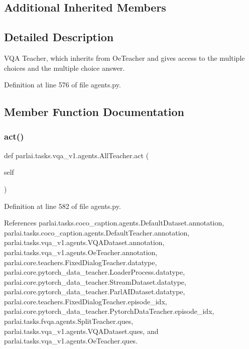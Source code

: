 \subsection*{Additional Inherited Members}


\subsection{Detailed Description}
\begin{DoxyVerb}VQA Teacher, which inherits from OeTeacher and gives access to
the multiple choices and the multiple choice answer.
\end{DoxyVerb}
 

Definition at line 576 of file agents.\+py.



\subsection{Member Function Documentation}
\mbox{\label{classparlai_1_1tasks_1_1vqa__v1_1_1agents_1_1AllTeacher_af1d9fbd6919aba788a5c76f3fbe59957}} 
\subsubsection{\texorpdfstring{act()}{act()}}
{\footnotesize\ttfamily def parlai.\+tasks.\+vqa\+\_\+v1.\+agents.\+All\+Teacher.\+act (\begin{DoxyParamCaption}\item[{}]{self }\end{DoxyParamCaption})}



Definition at line 582 of file agents.\+py.



References parlai.\+tasks.\+coco\+\_\+caption.\+agents.\+Default\+Dataset.\+annotation, parlai.\+tasks.\+coco\+\_\+caption.\+agents.\+Default\+Teacher.\+annotation, parlai.\+tasks.\+vqa\+\_\+v1.\+agents.\+V\+Q\+A\+Dataset.\+annotation, parlai.\+tasks.\+vqa\+\_\+v1.\+agents.\+Oe\+Teacher.\+annotation, parlai.\+core.\+teachers.\+Fixed\+Dialog\+Teacher.\+datatype, parlai.\+core.\+pytorch\+\_\+data\+\_\+teacher.\+Loader\+Process.\+datatype, parlai.\+core.\+pytorch\+\_\+data\+\_\+teacher.\+Stream\+Dataset.\+datatype, parlai.\+core.\+pytorch\+\_\+data\+\_\+teacher.\+Parl\+A\+I\+Dataset.\+datatype, parlai.\+core.\+teachers.\+Fixed\+Dialog\+Teacher.\+episode\+\_\+idx, parlai.\+core.\+pytorch\+\_\+data\+\_\+teacher.\+Pytorch\+Data\+Teacher.\+episode\+\_\+idx, parlai.\+tasks.\+fvqa.\+agents.\+Split\+Teacher.\+ques, parlai.\+tasks.\+vqa\+\_\+v1.\+agents.\+V\+Q\+A\+Dataset.\+ques, and parlai.\+tasks.\+vqa\+\_\+v1.\+agents.\+Oe\+Teacher.\+ques.



